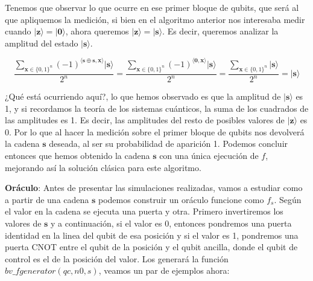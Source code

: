  \vspace{10pt}

 Tenemos que observar lo que ocurre en ese primer bloque de qubits, que será al que apliquemos la medición, si bien en el algoritmo anterior nos interesaba medir cuando $|\mathbf{z}\rangle=|\mathbf{0}\rangle$, ahora queremos $|\mathbf{z}\rangle=|\mathbf{s}\rangle$. Es decir, queremos analizar la amplitud del estado $|\mathbf{s}\rangle$.

 \begin{equation}
    \dfrac{\sum_{\mathbf{x} \in \{0,1\}^{n}}(-1)^{\langle\mathbf{s}\oplus \mathbf{s},\mathbf{x}\rangle}|\mathbf{s}\rangle}{2^{n}} = \dfrac{\sum_{\mathbf{x} \in \{0,1\}^{n}}(-1)^{\langle\mathbf{0},\mathbf{x}\rangle}|\mathbf{s}\rangle}{2^{n}}= \dfrac{\sum_{\mathbf{x} \in \{0,1\}^{n}}|\mathbf{s}\rangle}{2^{n}} = |\mathbf{s}\rangle
 \end{equation}

 \vspace{5pt}

 ¿Qué está ocurriendo aquí?, lo que hemos observado es que la amplitud de $|\mathbf{s}\rangle$ es 1, y si recordamos la teoría de los sistemas cuánticos, la suma de los cuadrados de las amplitudes es 1. Es decir, las amplitudes del resto de posibles valores de $|\mathbf{z}\rangle$ es 0. Por lo que al hacer la medición sobre el primer bloque de qubits nos devolverá la cadena $\mathbf{s}$ deseada, al ser su probabilidad de aparición 1. Podemos concluir entonces que hemos obtenido la cadena $\mathbf{s}$ con una única ejecución de $f$, mejorando así la solución clásica para este algoritmo.

 \vspace{10pt}

 \textbf{Oráculo}: Antes de presentar las simulaciones realizadas, vamos a estudiar como a partir de una cadena $\mathbf{s}$ podemos construir un oráculo funcione como $f_{s}$. Según el valor en la cadena se ejecuta una puerta y otra. Primero invertiremos los valores de $\mathbf{s}$ y a continuación, si el valor es 0, entonces pondremos una puerta identidad en la linea del qubit de esa posición y si el valor es 1, pondremos una puerta CNOT entre el qubit de la posición y el qubit ancilla, donde el qubit de control es el de la posición del valor. Los generará la función \textit{$bv\_fgenerator(qc,n0,s)$}, veamos un par de ejemplos ahora:
 
